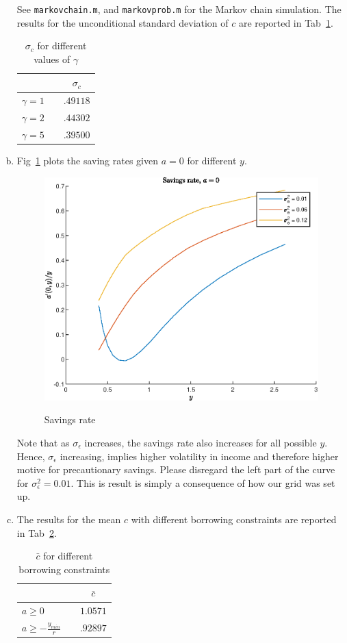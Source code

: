 \documentclass[12pt]{article}
\newcommand{\1}{{\bf 1}} %
\begin{document}
\begin{enumerate}[(a)]
See \texttt{markovchain.m}, and \texttt{markovprob.m} for the Markov chain simulation. The results for the unconditional standard deviation of $c$ are reported in Tab~\ref{tab:tab4}.
\begin{table}[H]
	\centering
	\label{tab:tab4}
	\begin{tabular}{@{}llc@{}}
		\toprule
		& &$\sigma_c$    \\ \midrule
		$\gamma = 1$      &          & $.49118	$               \\
		$\gamma = 2$  &             & $.44302$              \\
		$\gamma = 5$ & & $.39500$            \\ \bottomrule
	\end{tabular}
	\caption{$\sigma_c$ for different values of $\gamma$}
\end{table}




\item

Fig~\ref{fig:fig3} plots the saving rates given $a=0$ for different $y$. 
	\begin{figure}[H]
	\centering
	\includegraphics[width=0.7\linewidth]{fig3}
	\label{fig:fig3}
	\caption{Savings rate}
\end{figure}

Note that as $\sigma_\epsilon$ increases, the savings rate also increases for all possible $y$. Hence, $\sigma_\epsilon$ increasing, implies higher volatility in income and therefore higher motive for precautionary savings. Please disregard the left part of the curve for $\sigma_\epsilon^2=0.01$. This is result is simply a consequence of how our grid was set up.

\item

The results for the mean $c$ with different borrowing constraints are reported in Tab~\ref{tab:tab5}.
\begin{table}[H]
	\centering
	\label{tab:tab5}
	\begin{tabular}{@{}llc@{}}
		\toprule
		& &$\bar{c}$    \\ \midrule
		$a\geq0$      &          & $1.0571	$               \\
		$a\geq-\frac{y_{min}}{r}$  &             & $.92897$        \\ \bottomrule
	\end{tabular}
	\caption{$\bar{c}$ for different borrowing constraints}
\end{table}


\end{enumerate}
\end{document}
